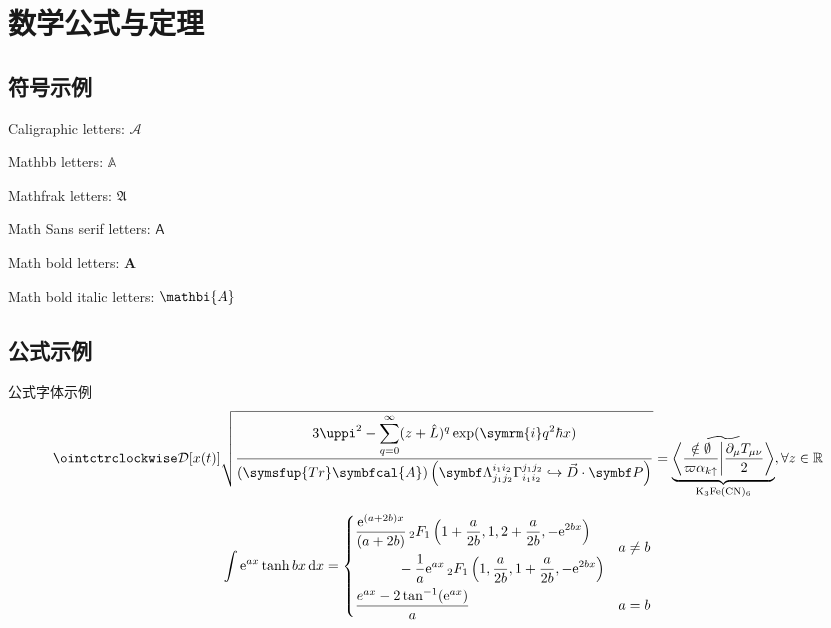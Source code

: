 \chapter{数学公式与定理}

\section{符号示例}

Caligraphic letters: $\mathcal{A}$ 

Mathbb letters: $\mathbb{A}$

Mathfrak letters: $\mathfrak{A}$

Math Sans serif letters: $\mathsf{A}$

Math bold letters: $\mathbf{A}$

Math bold italic letters: $\mathbi{A}$

\section{公式示例}

公式字体示例
\[
    \displaystyle \ointctrclockwise\mathcal{D}[x(t)]\sqrt{\frac{\displaystyle3\uppi^2-\sum_{q=0}^{\infty}(z+\hat L)^{q}\exp(\symrm{i}q^2 \hbar x)}{\displaystyle (\symsfup{Tr}\symbfcal{A})\left(\symbf\Lambda_{j_1j_2}^{i_1i_2}\Gamma_{i_1i_2}^{j_1j_2}\hookrightarrow\vec D\cdot \symbf P  \right)}}
    =\underbrace{\widetilde{\left\langle \frac{\notin \emptyset}{\varpi\alpha_{k\uparrow}}\middle\vert \frac{\partial_\mu T_{\mu\nu}}{2}\right\rangle}}_{\mathrm{K}_3\mathrm{Fe}(\mathrm{CN})_6} ,\forall z \in \mathbb{R}
\]

\begin{equation}\label{eq:dewitt}
    \int \mathrm{e}^{ax} \tanh {bx} \, \mathrm{d}x =
    \begin{dcases}
        \begin{multlined}
            \frac{\mathrm{e}^{(a+2b)x}}{(a + 2b)} \,
            {{}_2F_1} \left( 1 + \frac{a}{2b}, 1, 2+\frac{a}{2b}, -\mathrm{e}^{2bx} \right) \\
            - \frac{1}{a} \mathrm{e}^{ax} \, {{}_2F_1} \left( 1, \frac{a}{2b}, 1 + \frac{a}{2b}, -\mathrm{e}^{2bx} \right)
        \end{multlined}
        & a \ne b \\
    \frac{e^{ax} - 2 \tan^{-1}(\mathrm{e}^{ax})}{a} & a = b
  \end{dcases}
\end{equation}

